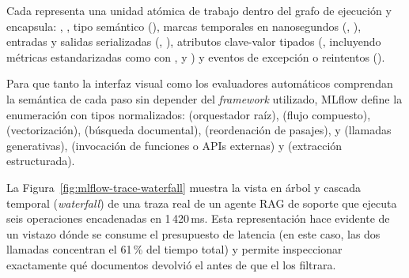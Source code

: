 Cada  representa una unidad atómica de trabajo dentro del grafo de ejecución y encapsula: , , tipo semántico (), marcas temporales en nanosegundos (, ), entradas y salidas serializadas (, ), atributos clave-valor tipados (, incluyendo métricas estandarizadas como  con ,  y ) y eventos de excepción o reintentos ().

Para que tanto la interfaz visual como los evaluadores automáticos comprendan la semántica de cada paso sin depender del \textit{framework} utilizado, MLflow define la enumeración  con tipos normalizados:  (orquestador raíz),  (flujo compuesto),  (vectorización),  (búsqueda documental),  (reordenación de pasajes),  y  (llamadas generativas),  (invocación de funciones o APIs externas) y  (extracción estructurada).

La Figura~\ref{fig:mlflow-trace-waterfall} muestra la vista en árbol y cascada temporal (\textit{waterfall}) de una traza real de un agente RAG de soporte que ejecuta seis operaciones encadenadas en 1\,420\,ms. Esta representación hace evidente de un vistazo dónde se consume el presupuesto de latencia (en este caso, las dos llamadas  concentran el 61\,\% del tiempo total) y permite inspeccionar exactamente qué documentos devolvió el  antes de que el  los filtrara.

